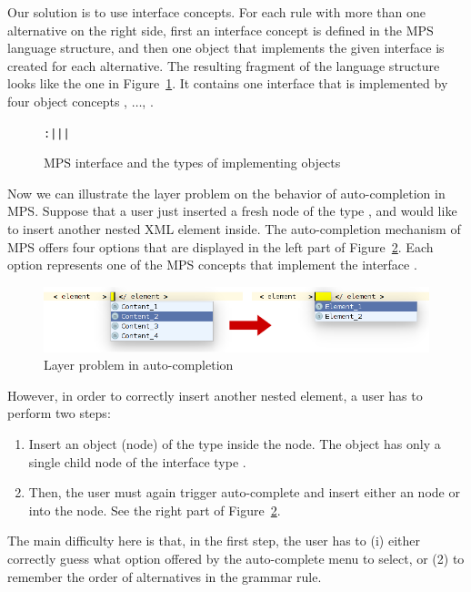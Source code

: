 Our solution is to use interface concepts.
For each rule with more than one alternative on the right side, first an interface concept is defined in the MPS language structure, and then one object that implements the given interface is created for each alternative.
The resulting fragment of the language structure looks like the one in Figure~\ref{fig:ICONTENTITF}.
It contains one interface  that is implemented by four object concepts , $\ldots$, .

\begin{figure}[ht]
\vspace{-2mm}
\centering
\begin{alltt}
\small
{} :  |  |  | 
\end{alltt}
\caption{MPS interface  and the types of implementing objects}
\label{fig:ICONTENTITF}
\end{figure}

Now we can illustrate the layer problem on the behavior of auto-completion in MPS.
Suppose that a user just inserted a fresh node of the type , and would like to insert another nested XML element inside.
The auto-completion mechanism of MPS offers four options that are displayed in the left part of Figure~\ref{fig:LAYERPROBLEM}.
Each option represents one of the MPS concepts that implement the interface .

\begin{figure}[ht]
	\centering
	\includegraphics[scale=0.5]{./images/layer_problem.png}
	\caption{Layer problem in auto-completion}
	\label{fig:LAYERPROBLEM}
\end{figure}

However, in order to correctly insert another nested element, a user has to perform two steps:
\begin{enumerate}
	\item Insert an object (node) of the type  inside the  node. The  object has only a single child node of the interface type .
	\item Then, the user must again trigger auto-complete and insert either an  node or  into the  node. See the right part of Figure~\ref{fig:LAYERPROBLEM}.
\end{enumerate}
The main difficulty here is that, in the first step, the user has to (i) either correctly guess what option offered by the auto-complete menu to select, or (2) to remember the order of alternatives in the grammar rule.


